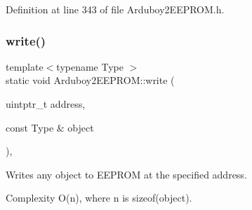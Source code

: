 Definition at line 343 of file Arduboy2\+E\+E\+P\+R\+O\+M.\+h.

\mbox{\label{classArduboy2EEPROM_abf7be1f27f4815de59257210dac8c9eb}} 
\subsubsection{\texorpdfstring{write()}{write()}}
{\footnotesize\ttfamily template$<$typename Type $>$ \\
static void Arduboy2\+E\+E\+P\+R\+O\+M\+::write (\begin{DoxyParamCaption}\item[{uintptr\+\_\+t}]{address,  }\item[{const Type \&}]{object }\end{DoxyParamCaption})\hspace{0.3cm}{\ttfamily [inline]}, {\ttfamily [static]}}



Writes any object to E\+E\+P\+R\+OM at the specified address. 

\begin{DoxyParagraph}{Complexity}
{\ttfamily O(n)}, where {\ttfamily n} is {\ttfamily sizeof(object)}.
\end{DoxyParagraph}

